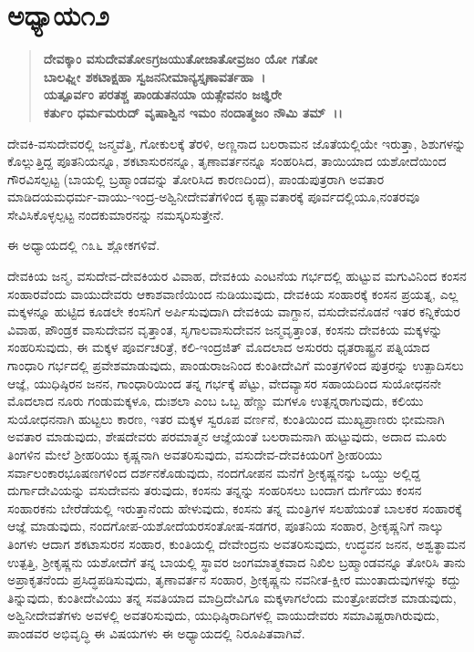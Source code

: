 \vskip 1cm

\section*{ಅಧ್ಯಾಯ\enginline{-}೧೨}

\begin{verse}
\textbf{ದೇವಕ್ಕಾಂ ವಸುದೇವತೋಽಗ್ರಜಯುತೋಜಾತೋವ್ರಜಂ ಯೋ ಗತೋ}\\\textbf{ಬಾಲಘ್ನೀ ಶಕಟಾಕ್ಷಹಾ ಸ್ವಜನನೀಮಾನ್ಯಸ್ತೃಣಾವರ್ತಹಾ~।}\\\textbf{ಯತ್ಪೂರ್ವಂ ಪರತಶ್ಚ ಪಾಂಡುತನಯಾ ಯತ್ಸೇವನಂ ಜಜ್ಞಿರೇ}\\\textbf{ಕರ್ತುಂ ಧರ್ಮಮರುದ್ ವೃಷಾಶ್ವಿನ ಇಮಂ ನಂದಾತ್ಮಜಂ ನೌಮಿ ತಮ್~।।}
\end{verse}

ದೇವಕಿ-ವಸುದೇವರಲ್ಲಿ ಜನ್ಮವೆತ್ತಿ, ಗೋಕುಲಕ್ಕೆ ತೆರಳಿ, ಅಣ್ಣನಾದ ಬಲರಾಮನ ಜೊತೆಯಲ್ಲಿಯೇ ಇರುತ್ತಾ, ಶಿಶುಗಳನ್ನು ಕೊಲ್ಲುತ್ತಿದ್ದ ಪೂತನಿಯನ್ನೂ, ಶಕಟಾಸುರನನ್ನೂ, ತೃಣಾವರ್ತನನ್ನೂ ಸಂಹರಿಸಿದ, ತಾಯಿಯಾದ ಯಶೋದೆಯಿಂದ ಗೌರವಿಸಲ್ಪಟ್ಟ (ಬಾಯಲ್ಲಿ ಬ್ರಹ್ಮಾಂಡವನ್ನು ತೋರಿಸಿದ ಕಾರಣದಿಂದ), ಪಾಂಡುಪುತ್ರರಾಗಿ ಅವತಾರ ಮಾಡಿದ\break ಯಮಧರ್ಮ-ವಾಯು-ಇಂದ್ರ-ಅಶ್ವಿನೀದೇವತೆಗಳಿಂದ ಕೃಷ್ಣಾವತಾರಕ್ಕೆ ಪೂರ್ವದಲ್ಲಿಯೂ,\break ನಂತರವೂ ಸೇವಿಸಿಕೊಳ್ಳಲ್ಪಟ್ಟ ನಂದಕುಮಾರನನ್ನು ನಮಸ್ಕರಿಸುತ್ತೇನೆ.

ಈ ಅಧ್ಯಾಯದಲ್ಲಿ ೧೩೬ ಶ್ಲೋಕಗಳಿವೆ.

ದೇವಕಿಯ ಜನ್ಮ, ವಸುದೇವ-ದೇವಕಿಯರ ವಿವಾಹ, ದೇವಕಿಯ ಎಂಟನೆಯ ಗರ್ಭದಲ್ಲಿ ಹುಟ್ಟುವ ಮಗುವಿನಿಂದ ಕಂಸನ ಸಂಹಾರವೆಂದು ವಾಯುದೇವರು ಆಕಾಶವಾಣಿಯಿಂದ ನುಡಿಯುವುದು, ದೇವಕಿಯ ಸಂಹಾರಕ್ಕೆ ಕಂಸನ ಪ್ರಯತ್ನ, ಎಲ್ಲ ಮಕ್ಕಳನ್ನೂ ಹುಟ್ಟಿದ ಕೂಡಲೇ ಕಂಸನಿಗೆ ಅರ್ಪಿಸುವುದಾಗಿ ದೇವಕಿಯ ವಾಗ್ದಾನ, ವಸುದೇವನೊಡನೆ ಇತರ ಕನ್ನಿಕೆಯರ ವಿವಾಹ, ಪೌಂಡ್ರಕ ವಾಸುದೇವನ ವೃತ್ತಾಂತ, ಸೃಗಾಲವಾಸುದೇವನ ಜನ್ಮವೃತ್ತಾಂತ, ಕಂಸನು ದೇವಕಿಯ ಮಕ್ಕಳನ್ನು ಸಂಹರಿಸುವುದು, ಈ ಮಕ್ಕಳ ಪೂರ್ವಚರಿತ್ರೆ, ಕಲಿ-\-ಇಂದ್ರಜಿತ್ ಮೊದಲಾದ ಅಸುರರು ಧೃತರಾಷ್ಟ್ರನ ಪತ್ನಿಯಾದ ಗಾಂಧಾರಿ ಗರ್ಭದಲ್ಲಿ ಪ್ರವೇಶಮಾಡುವುದು, ಪಾಂಡುರಾಜನಿಂದ ಕುಂತೀದೇವಿಗೆ ಮಂತ್ರಗಳಿಂದ ಪುತ್ರರನ್ನು ಉತ್ಪಾದಿಸಲು ಆಜ್ಞೆ, ಯುಧಿಷ್ಠಿರನ ಜನನ, ಗಾಂಧಾರಿಯಿಂದ ತನ್ನ ಗರ್ಭಕ್ಕೆ ಪೆಟ್ಟು, ವೇದವ್ಯಾಸರ ಸಹಾಯದಿಂದ ಸುಯೋಧನನೇ ಮೊದಲಾದ ನೂರು ಗಂಡುಮಕ್ಕಳೂ, ದುಃಶಲಾ ಎಂಬ ಒಬ್ಬ ಹೆಣ್ಣು ಮಗಳೂ ಉತ್ಪನ್ನರಾಗುವುದು, ಕಲಿಯು ಸುಯೋಧನನಾಗಿ ಹುಟ್ಟಲು ಕಾರಣ, ಇತರ ಮಕ್ಕಳ ಸ್ವರೂಪ ವರ್ಣನೆ, ಕುಂತಿಯಿಂದ ಮುಖ್ಯಪ್ರಾಣರು ಭೀಮನಾಗಿ ಅವತಾರ ಮಾಡುವುದು, ಶೇಷದೇವರು ಪರಮಾತ್ಮನ ಆಜ್ಞೆಯಂತೆ ಬಲರಾಮನಾಗಿ ಹುಟ್ಟುವುದು, ಅದಾದ ಮೂರು ತಿಂಗಳಿನ ಮೇಲೆ ಶ‍್ರೀಹರಿಯು ಕೃಷ್ಣನಾಗಿ ಅವತರಿಸುವುದು, ವಸುದೇವ-ದೇವಕಿ\-ಯರಿಗೆ ಶ‍್ರೀಹರಿಯು ಸರ್ವಾಲಂಕಾರಭೂಷಣಗಳಿಂದ ದರ್ಶನಕೊಡುವುದು, ನಂದಗೋಪನ ಮನೆಗೆ ಶ‍್ರೀಕೃಷ್ಣನನ್ನು ಒಯ್ದು ಅಲ್ಲಿದ್ದ ದುರ್ಗಾದೇವಿಯನ್ನು ವಸುದೇವನು ತರುವುದು, ಕಂಸನು ತನ್ನನ್ನು ಸಂಹರಿಸಲು ಬಂದಾಗ ದುರ್ಗೆಯು ಕಂಸನ ಸಂಹಾರಕನು ಬೇರೆಡೆಯಲ್ಲಿ ಇರುತ್ತಾನೆಂದು ಹೇಳುವುದು, ಕಂಸನು ತನ್ನ ಮಂತ್ರಿಗಳ ಸಲಹೆಯಂತೆ ಬಾಲಕರ ಸಂಹಾರಕ್ಕೆ ಆಜ್ಞೆ ಮಾಡುವುದು, ನಂದಗೋಪ-ಯಶೋದೆಯರ\break ಸಂತೋಷ-ಸಡಗರ, ಪೂತನಿಯ ಸಂಹಾರ, ಶ‍್ರೀಕೃಷ್ಣನಿಗೆ ನಾಲ್ಕು ತಿಂಗಳು ಆದಾಗ ಶಕಟಾಸುರನ ಸಂಹಾರ, ಕುಂತಿಯಲ್ಲಿ ದೇವೇಂದ್ರನು ಅವತರಿಸುವುದು, ಉದ್ಧವನ ಜನನ, ಅಶ್ವತ್ಥಾಮನ ಉತ್ಪತ್ತಿ, ಶ‍್ರೀಕೃಷ್ಣನು ಯಶೋದೆಗೆ ತನ್ನ ಬಾಯಲ್ಲಿ ಸ್ಥಾವರ ಜಂಗಮಾತ್ಮಕವಾದ ನಿಖಿಲ ಬ್ರಹ್ಮಾಂಡವನ್ನೂ ತೋರಿಸಿ ತಾನು ಅಪ್ರಾಕೃತನೆಂದು ಪ್ರಸಿದ್ಧಪಡಿಸುವುದು, ತೃಣಾವರ್ತನ ಸಂಹಾರ, ಶ‍್ರೀಕೃಷ್ಣನು ನವನೀತ-ಕ್ಷೀರ ಮುಂತಾದುವುಗಳನ್ನು ಕದ್ದು ತಿನ್ನುವುದು, ಕುಂತೀದೇವಿಯು ತನ್ನ ಸವತಿಯಾದ ಮಾದ್ರಿದೇವಿಗೂ ಮಕ್ಕಳಾಗಲೆಂದು ಮಂತ್ರೋಪದೇಶ ಮಾಡುವುದು, ಅಶ್ವಿನೀದೇವತೆಗಳು ಅವಳಲ್ಲಿ ಅವತರಿಸುವುದು, ಯುಧಿಷ್ಠಿರಾದಿಗಳಲ್ಲಿ ವಾಯುದೇವರು ಸಮಾವಿಷ್ಟರಾಗಿರುವುದು, ಪಾಂಡವರ ಅಭಿವೃದ್ಧಿ ಈ ವಿಷಯಗಳು ಈ ಅಧ್ಯಾಯದಲ್ಲಿ ನಿರೂಪಿತವಾಗಿವೆ.


